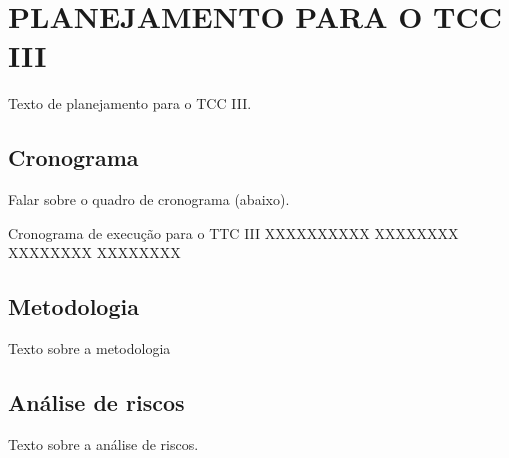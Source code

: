 \chapter{PLANEJAMENTO PARA O TCC III}
\label{cap:planTcc}

Texto de planejamento para o TCC III.

\section{Cronograma}

Falar sobre o quadro de cronograma (abaixo).

\vspace{10pt}

\begin{cronograma}
    {Cronograma de execução para o TTC III}
    \label{tab:cronograma3}
     {}{XXXX}{XXXX}{XX\nX\nX}{}{}
     {}{}{XXXX}{XXXX}{}{}
     {}{}{}{XXXX}{XXXX}{}
     {}{}{}{XXXX}{XXXX}{}
\end{cronograma}

\section{Metodologia}

Texto sobre a metodologia

\section{Análise de riscos}

Texto sobre a análise de riscos.
